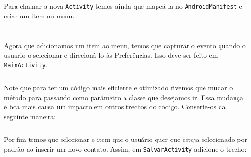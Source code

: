 \begin{listing}[H]
  \inputminted[linenos=true,frame=bottomline,tabsize=3]{ java }{ source/EditarPreferencias-1.java }
  \caption{Activity para mostrar preferências [EditarPreferencias.java]}
\end{listing}

Para chamar a nova \texttt{Activity} temos ainda que mapeá-la no \texttt{AndroidManifest} e criar
um item no menu.

\begin{listing}[H]
  \inputminted[linenos=true,frame=bottomline,tabsize=3]{ xml }{ source/AndroidManifest-4.xml }
  \caption{Mapeando Activity EditarPreferencias [AndroidManifest.xml]}
\end{listing}

\begin{listing}[H]
  \inputminted[linenos=true,frame=bottomline,tabsize=3]{ xml }{ source/main_menu-2.xml }
  \caption{Adicionar item Preferências ao menu principal [res/menu/main\b{ }menu.xml]}
\end{listing}

Agora que adicionamos um item ao menu, temos que capturar o evento quando o usuário o selecionar
e direcioná-lo às Preferências. Isso deve ser feito em \texttt{MainActivity}.

\begin{listing}[H]
  \inputminted[linenos=true,frame=bottomline,tabsize=3]{ java }{ source/MainActivity-12.java }
  \caption{Ir para Preferências pelo menu principal [MainActivity.java]}
\end{listing}

Note que para ter um código mais eficiente e otimizado tivemos que mudar o método 
para  passando como parâmetro a classe que desejamos ir. Essa mudança é boa mais causa
um impacto em outros trechos do código. Conserte-os da seguinte maneira:

\begin{listing}[H]
  \inputminted[linenos=true,frame=bottomline,tabsize=3]{ java }{ source/MainActivity-13.java }
  \caption{Mudança em método irParaSalvar [MainActivity.java]}
\end{listing}

Por fim temos que selecionar o item que o usuário quer que esteja selecionado por padrão ao inserir
um novo contato. Assim, em \texttt{SalvarActivity} adicione o trecho:

